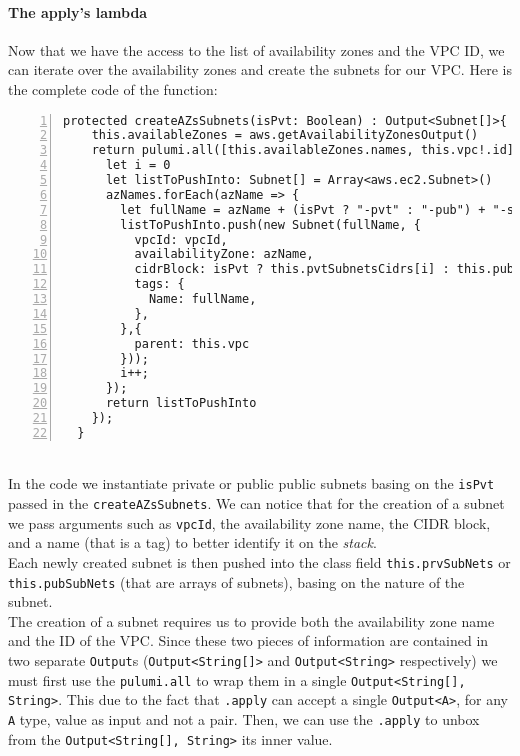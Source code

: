 \paragraph{The apply's lambda}
\label{par:ts-lambda}
Now that we have the access to the list of availability zones and the VPC ID, we can iterate over the availability zones and create the subnets for our VPC.
Here is the complete code of the function:
\begin{lstlisting}[numbers=left, numberstyle=\tiny, numbersep=-5pt, stepnumber=1]
  protected createAZsSubnets(isPvt: Boolean) : Output<Subnet[]>{
    this.availableZones = aws.getAvailabilityZonesOutput()
    return pulumi.all([this.availableZones.names, this.vpc!.id]).apply(([azNames, vpcId]) => {
      let i = 0
      let listToPushInto: Subnet[] = Array<aws.ec2.Subnet>()
      azNames.forEach(azName => {
        let fullName = azName + (isPvt ? "-pvt" : "-pub") + "-subnet-typescript"
        listToPushInto.push(new Subnet(fullName, {
          vpcId: vpcId,
          availabilityZone: azName,
          cidrBlock: isPvt ? this.pvtSubnetsCidrs[i] : this.pubSubnetsCidrs[i],
          tags: {
            Name: fullName,
          },
        },{
          parent: this.vpc
        }));
        i++;
      });
      return listToPushInto
    });
  }
\end{lstlisting}\mbox{}\\
In the code we instantiate private or public public subnets basing on the \texttt{isPvt} passed in the \texttt{createAZsSubnets}.
We can notice that for the creation of a subnet we pass arguments such as \texttt{vpcId}, the availability zone name, the CIDR block, and a name (that is a tag) to better identify it on the \textit{stack}.\\
Each newly created subnet is then pushed into the class field \texttt{this.prvSubNets} or \texttt{this.pubSubNets} (that are arrays of subnets), basing on the nature of the subnet.\\
The creation of a subnet requires us to provide both the availability zone name and the ID of the VPC.
Since these two pieces of information are contained in two separate \texttt{Output}s (\texttt{Output<String[]>} and \texttt{Output<String>} respectively) we must first use the \texttt{pulumi.all} to wrap them in a single \texttt{Output<String[], String>}.
This due to the fact that \texttt{.apply} can accept a single \texttt{Output<A>}, for any \texttt{A} type, value as input and not a pair.
Then, we can use the \texttt{.apply} to unbox from the \texttt{Output<String[], String>} its inner value.
